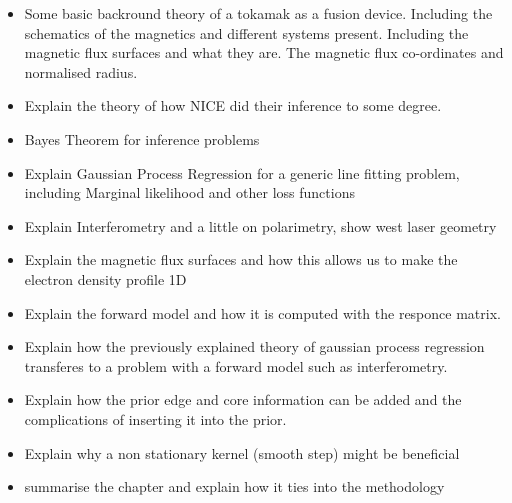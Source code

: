 \begin{itemize}
    \item Some basic backround theory of a tokamak as a fusion device. Including the schematics of the magnetics and different systems present. Including the magnetic flux surfaces and what they are. The magnetic flux co-ordinates and normalised radius. 
    \item Explain the theory of how NICE did their inference to some degree.
    \item Bayes Theorem for inference problems
    \item Explain Gaussian Process Regression for a generic line fitting problem, including Marginal likelihood and other loss functions
    \item Explain Interferometry and a little on polarimetry, show west laser geometry
    \item Explain the magnetic flux surfaces and how this allows us to make the electron density profile 1D
    \item Explain the forward model and how it is computed with the responce matrix.
    \item Explain how the previously explained theory of gaussian process regression transferes to a problem with a forward model such as interferometry.
    \item Explain how the prior edge and core information can be added and the complications of inserting it into the prior.
    \item Explain why a non stationary kernel (smooth step) might be beneficial 
    \item summarise the chapter and explain how it ties into the methodology
\end{itemize}





